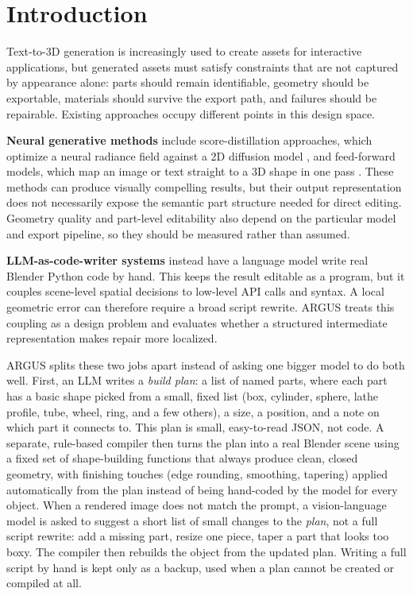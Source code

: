 \documentclass[conference]{IEEEtran}
\begin{document}
\section{Introduction}

Text-to-3D generation is increasingly used to create assets for interactive applications, but generated assets must satisfy constraints that are not captured by appearance alone: parts should remain identifiable, geometry should be exportable, materials should survive the export path, and failures should be repairable. Existing approaches occupy different points in this design space.

\textbf{Neural generative methods} include score-distillation approaches, which optimize a neural radiance field against a 2D diffusion model \cite{poole2023dreamfusion,lin2023magic3d,chen2023fantasia3d}, and feed-forward models, which map an image or text straight to a 3D shape in one pass \cite{jun2023shape,tochilkin2024triposr,xiang2024trellis}. These methods can produce visually compelling results, but their output representation does not necessarily expose the semantic part structure needed for direct editing. Geometry quality and part-level editability also depend on the particular model and export pipeline, so they should be measured rather than assumed.

\textbf{LLM-as-code-writer systems} \cite{lu2025ll3m,yang2024scenecraft} instead have a language model write real Blender Python code by hand. This keeps the result editable as a program, but it couples scene-level spatial decisions to low-level API calls and syntax. A local geometric error can therefore require a broad script rewrite. ARGUS treats this coupling as a design problem and evaluates whether a structured intermediate representation makes repair more localized.

ARGUS splits these two jobs apart instead of asking one bigger model to do both well. First, an LLM writes a \emph{build plan}: a list of named parts, where each part has a basic shape picked from a small, fixed list (box, cylinder, sphere, lathe profile, tube, wheel, ring, and a few others), a size, a position, and a note on which part it connects to. This plan is small, easy-to-read JSON, not code. A separate, rule-based compiler then turns the plan into a real Blender scene using a fixed set of shape-building functions that always produce clean, closed geometry, with finishing touches (edge rounding, smoothing, tapering) applied automatically from the plan instead of being hand-coded by the model for every object. When a rendered image does not match the prompt, a vision-language model is asked to suggest a short list of small changes to the \emph{plan}, not a full script rewrite: add a missing part, resize one piece, taper a part that looks too boxy. The compiler then rebuilds the object from the updated plan. Writing a full script by hand is kept only as a backup, used when a plan cannot be created or compiled at all.
\end{document}
